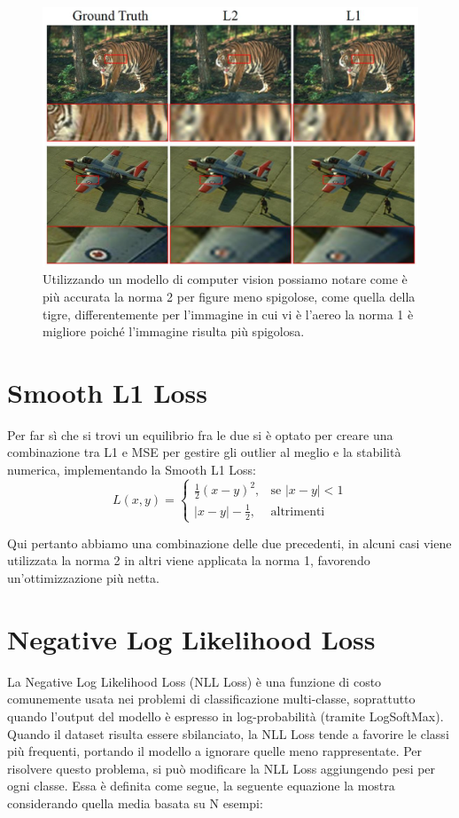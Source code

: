 \begin{figure}
    \centering
    \includegraphics[width=0.75\linewidth]{figure/L1andL2.png}
    \caption{Utilizzando un modello di computer vision possiamo notare come è più accurata la norma 2 per figure meno spigolose, come quella della tigre, differentemente per l'immagine in cui vi è l'aereo la norma 1 è migliore poiché l'immagine risulta più spigolosa.}
    \label{fig:l1l2diff}
\end{figure}

\section{Smooth L1 Loss}
Per far sì che si trovi un equilibrio fra le due si è optato per creare una combinazione tra L1 e MSE per gestire gli outlier al meglio e la stabilità numerica, implementando la Smooth L1 Loss:
\begin{equation}
L(x, y) = \begin{cases} 
\frac{1}{2} (x - y)^2, & \text{se } |x - y| < 1 \\
|x - y| - \frac{1}{2}, & \text{altrimenti}
\end{cases}
\end{equation}

Qui pertanto abbiamo una combinazione delle due precedenti, in alcuni casi viene utilizzata la norma 2 in altri viene applicata la norma 1, favorendo un'ottimizzazione più netta.
\section{Negative Log Likelihood Loss}
La Negative Log Likelihood Loss (NLL Loss) è una funzione di costo comunemente usata nei problemi di classificazione multi-classe, soprattutto quando l'output del modello è espresso in log-probabilità (tramite LogSoftMax). Quando il dataset risulta essere sbilanciato, la NLL Loss tende a favorire le classi più frequenti, portando il modello a ignorare quelle meno rappresentate. Per risolvere questo problema, si può modificare la NLL Loss aggiungendo pesi per ogni classe. Essa è definita come segue, la seguente equazione la mostra considerando quella media basata su N esempi:

